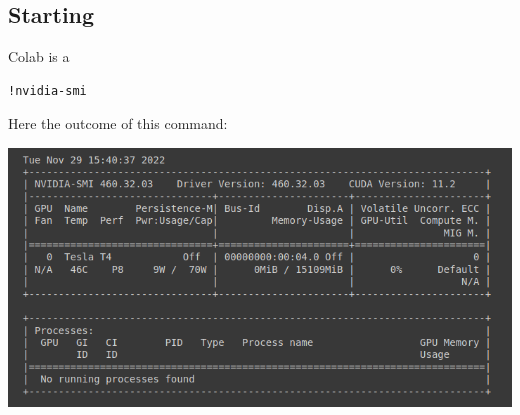 \documentclass[10pt,a4paper]{article}
\begin{document}
\subsection{Starting}
Colab is a 
\begin{lstlisting}
!nvidia-smi
\end{lstlisting}
Here the outcome of this command:
\begin{center}
\includegraphics[scale=0.8]{nvidiasmi.png}
\end{center}
\end{document}
